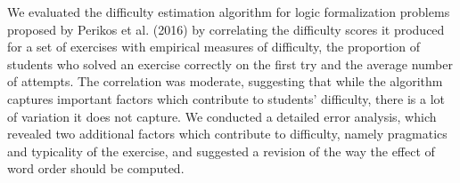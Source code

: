 We evaluated the difficulty estimation algorithm for logic formalization problems proposed by Perikos et al. (2016) by correlating the difficulty scores it produced for a set of exercises with empirical measures of difficulty, the proportion of students who solved an exercise correctly on the first try and the average number of attempts. The correlation was moderate, suggesting that while the algorithm captures important factors which contribute to students' difficulty, there is a lot of variation it does not capture. We conducted a detailed error analysis, which revealed two additional factors which contribute to difficulty, namely pragmatics and typicality of the exercise, and suggested a revision of the way the effect of word order should be computed.
